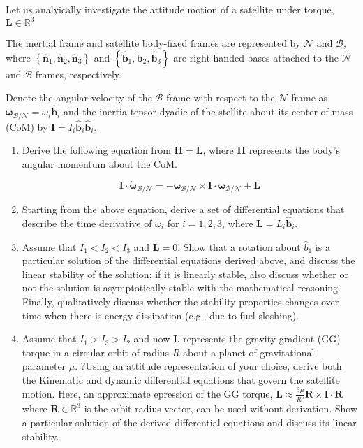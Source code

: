 \documentclass[
]{article}
\begin{document}
Let us analyically investigate the attitude motion of a satellite under
torque, \(\boldsymbol{L} \in \mathbb{R}^3\)

The inertial frame and satellite body-fixed frames are represented by
\(\mathcal{N}\) and \(\mathcal{B}\), where
\(\left\{\hat{\boldsymbol{n}}_1, \hat{\boldsymbol{n}}_2, \hat{\boldsymbol{n}}_3\right\}\)
and
\(\left\{\hat{\boldsymbol{b}}_1, \hat{\boldsymbol{b}}_2, \hat{\boldsymbol{b}}_3\right\}\)
are right-handed bases attached to the \(\mathcal{N}\) and
\(\mathcal{B}\) frames, respectively.

Denote the angular velocity of the \(\mathcal{B}\) frame with respect to
the \(\mathcal{N}\) frame as
\(\boldsymbol{\omega}_\mathcal{B/N} = \omega_i \hat{\boldsymbol{b}}_i\)
and the inertia tensor dyadic of the stellite about its center of mass
(CoM) by
\(\boldsymbol{I} = I_i \hat{\boldsymbol{b}}_i \hat{\boldsymbol{b}}_i\).

\begin{enumerate}
\item
  Derive the following equation from
  \(\dot{\boldsymbol{H}} = \boldsymbol{L}\), where \(\boldsymbol{H}\)
  represents the body's angular momentum about the CoM.

  \[\boldsymbol{I} \cdot \dot{\boldsymbol{\omega}}_\mathcal{B/N} = -\boldsymbol{\omega}_\mathcal{B/N} \times \boldsymbol{I} \cdot \boldsymbol{\omega}_\mathcal{B/N} + \boldsymbol{L}\]
\item
  Starting from the above equation, derive a set of differential
  equations that describe the time derivative of \(\omega_i\) for
  \(i = 1,2,3\), where \(\boldsymbol{L} = L_i \hat{\boldsymbol{b}}_i\).
\item
  Assume that \(I_1 < I_2 < I_3\) and \(\boldsymbol{L} = 0\). Show that
  a rotation about \(\hat{b}_1\) is a particular solution of the
  differential equations derived above, and discuss the linear stability
  of the solution; if it is linearly stable, also discuss whether or not
  the solution is asymptotically stable with the mathematical reasoning.
  Finally, qualitatively discuss whether the stability properties
  changes over time when there is energy dissipation (e.g., due to fuel
  sloshing).
\item
  Assume that \(I_1 > I_3 > I_2\) and now \(\boldsymbol{L}\) represents
  the gravity gradient (GG) torque in a circular orbit of radius \(R\)
  about a planet of gravitational parameter \(\mu\). ?Using an attitude
  representation of your choice, derive both the Kinematic and dynamic
  differential equations that govern the satellite motion. Here, an
  approximate epression of the GG torque,
  \(\boldsymbol{L} \approx \frac{3\mu}{R^5} \boldsymbol{R} \times \boldsymbol{I} \cdot \boldsymbol{R}\)
  where \(\boldsymbol{R} \in \mathbb{R}^3\) is the orbit radius vector,
  can be used without derivation. Show a particular solution of the
  derived differential equations and discuss its linear stability.
\end{enumerate}
\end{document}

